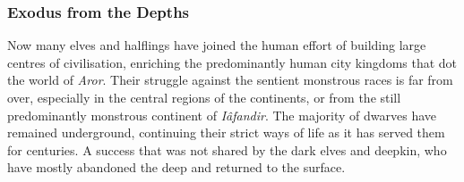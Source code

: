 \subsubsection{Exodus from the Depths}
\label{sec:Exodus from the Depths}

Now many elves and halflings have joined the human effort of building large
centres of civilisation, enriching the predominantly human city kingdoms that
dot the world of \emph{Aror}. Their struggle against the sentient monstrous
races is far from over, especially in the central regions of the continents,
or from the still predominantly monstrous continent of \emph{Iâfandir}. The
majority of dwarves have remained underground, continuing their strict ways of
life as it has served them for centuries. A success that was not shared by the
dark elves and deepkin, who have mostly abandoned the deep and returned to the
surface.















